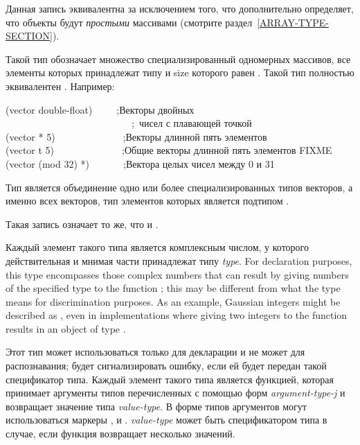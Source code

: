 \begin{flushdesc}
\item[\cd{(simple-array \emph{element-type} \emph{sizes})}]
  Данная запись эквивалентна  за
  исключением того, что дополнительно определяет, что объекты будут \emph{простыми}
  массивами (смотрите раздел~\ref{ARRAY-TYPE-SECTION}).

\item[\cd{(vector \emph{element-type} \emph{size})}]
  Такой тип обозначает множество специализированный одномерных массивов, все элементы
  которых принадлежат типу  и size которого равен
  . Такой тип полностью эквивалентен .
  Например:
  \begin{lisp}
    (vector double-float)~~~~~;\textrm{Векторы двойных } \\
    ~~~~~~~~~~~~~~~~~~~~~~~~~~;~\textrm{чисел с плавающей точкой} \\
    (vector * 5)~~~~~~~~~~~~~~;\textrm{Векторы длинной пять элементов} \\
    (vector t 5)~~~~~~~~~~~~~~;\textrm{Общие векторы длинной пять элементов FIXME} \\
    (vector (mod 32) *)~~~~~~~;\textrm{Вектора целых чисел между 0 и 31}
  \end{lisp}

Тип  является объединение одно или более специализированных типов
векторов, а именно всех векторов, тип элементов которых является подтипом .

\item[\cd{(simple-vector \emph{size})}]
  Такая запись означает то же, что и .

\item[\cd{(complex \emph{type})}]
  Каждый элемент такого типа является комплексным числом, у которого
  действительная и мнимая части принадлежат типу \emph{type}.
  For declaration purposes, this type encompasses those complex numbers
  that can result by giving numbers of the specified type
  to the function ; this may be different
  from what the type means for discrimination purposes.
  As an example, Gaussian integers might be
  described as , even in implementations
  where giving two integers to the function  results
  in an object of type .

\item[\cd{(function (\emph{argument-type-1} \emph{argument-type-2} ...) \emph{value-type})}]
  \relax Этот тип может использоваться только для декларации и не может для
  распознавания;  будет сигнализировать ошибку, если ей будет передан
  такой спецификатор типа. Каждый элемент такого типа является функцией, которая
  принимает аргументы типов перечисленных с помощью форм \emph{argument-type-j}
  и возвращает значение типа \emph{value-type}. В форме типов аргументов могут
  использоваться маркеры ,  и
  . \emph{value-type} может быть спецификатором типа  в
  случае, если функция возвращает несколько значений.


\end{flushdesc}
